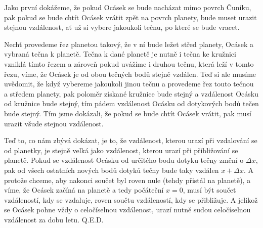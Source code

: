 \documentclass{fkssolpub}
\author{Ondřej Sedláček}
\begin{document}
Jako první dokážeme, že pokud Ocásek se bude nacházat mimo povrch Čuníku, pak pokud se bude chtít Ocásek vrátit zpět na povrch planety, bude muset urazit stejnou vzdálenost, ať už si vybere jakoukoli tečnu, po které se bude vracet.

Nechť provedeme řez planetou takový, že v ní bude ležet střed planety, Ocásek a vybraná tečna k planetě. Tečna k dané planetě je nutně i tečna ke kružnici vzniklá tímto řezem a zároveň pokud uvážíme i druhou tečnu, která leží v tomto řezu, víme, že Ocásek je od obou tečných bodů stejně vzdálen. Teď si ale musíme uvědomit, že když vybereme jakoukoli jinou tečnu a provedeme řez touto tečnou a středem planety, pak poloměr získané kružnice bude stejný a vzdálenost Ocásku od kružnice bude stejný, tím pádem vzdálenost Ocásku od dotykových bodů tečen bude stejný. Tím jsme dokázali, že pokud se bude chtít Ocásek vrátit, pak musí urazit všude stejnou vzdálenost.

Teď to, co nám zbývá dokázat, je to, že vzdálenost, kterou urazí při vzdalování se od planetky, je stejně velká jako vzdálenost, kterou urazí při přibližování se planetě. Pokud se vzdálenost Ocásku od určitého bodu dotyku tečny změní o $\Delta x$, pak od všech ostatních nových bodů dotyků tečny bude taky vzdálen $x + \Delta x$. A protože chceme, aby nakonci součet byl roven nule (tehdy přistál na planetě), a víme, že Ocásek začíná na planetě a tedy počáteční $x = 0$, musí být součet vzdáleností, kdy se vzdaluje, roven součtu vzdáleností, kdy se přibližuje. A jelikož se Ocásek pohne vždy o celočíselnou vzdálenost, urazí nutně sudou celočíselnou vzdálenost za dobu letu. Q.E.D.
\end{document}
